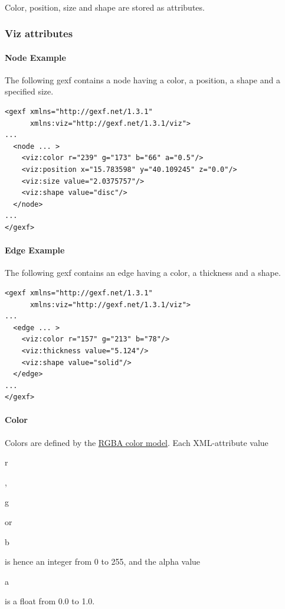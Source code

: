 \documentclass[a4paper,10pt]{article}
\begin{document}
\paragraph{}
Color, position, size and shape are stored as attributes.

\subsubsection{Viz attributes}

\paragraph{Node Example}

The following gexf contains a node having a color, a position, a shape and a specified size.

\lstset{ style=gexf }
\begin{lstlisting}[caption={VIZ Attributes},label=vizattr]
<gexf xmlns="http://gexf.net/1.3.1"
      xmlns:viz="http://gexf.net/1.3.1/viz">
...
  <node ... >
    <viz:color r="239" g="173" b="66" a="0.5"/>
    <viz:position x="15.783598" y="40.109245" z="0.0"/>
    <viz:size value="2.0375757"/>
    <viz:shape value="disc"/>
  </node>
...
</gexf>
\end{lstlisting}

\paragraph{Edge Example}

The following gexf contains an edge having a color, a thickness and a shape.

\lstset{ style=gexf }
\begin{lstlisting}[caption={VIZ Attributes},label=vizattr]
<gexf xmlns="http://gexf.net/1.3.1"
      xmlns:viz="http://gexf.net/1.3.1/viz">
...
  <edge ... >
    <viz:color r="157" g="213" b="78"/>
    <viz:thickness value="5.124"/>
    <viz:shape value="solid"/>
  </edge>
...
</gexf>
\end{lstlisting}

\paragraph{Color}

Colors are defined by the \href{http://en.wikipedia.org/wiki/RGBA}{RGBA color model}. Each XML-attribute value \begin{footnotesize}r\end{footnotesize}, \begin{footnotesize}g\end{footnotesize} or \begin{footnotesize}b\end{footnotesize} is hence an integer from 0 to 255, and the alpha value \begin{footnotesize}a\end{footnotesize} is a float from 0.0 to 1.0.
\end{document}
